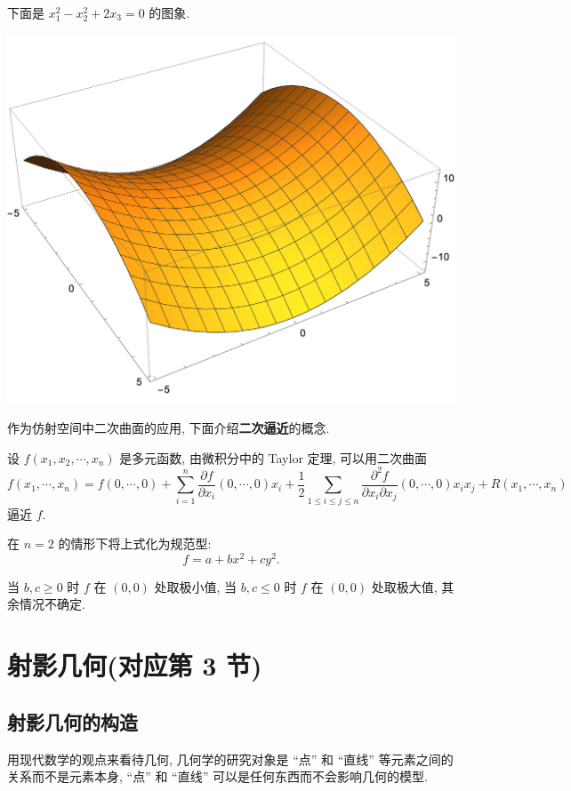 \documentclass[color=black,device=normal,lang=cn,mode=geye]{elegantnote}
\begin{document}
下面是 $x_1^2-x_2^2+2x_3=0$ 的图象.
\begin{center}
    \includegraphics[scale=.5]{materials/4.png}
\end{center}
作为仿射空间中二次曲面的应用, 下面介绍\textbf{二次逼近}的概念.
\begin{example}
    设 $f(x_1,x_2,\cdots,x_n)$ 是多元函数, 由微积分中的 Taylor 定理, 可以用二次曲面
    \[f(x_1,\cdots,x_n)=f(0,\cdots,0)+\sum\limits_{i=1}^n\dfrac{\partial f}{\partial x_i}(0,\cdots,0)x_i+\dfrac{1}{2}\sum\limits_{1\leq i\leq j\leq n}\dfrac{\partial^2f}{\partial x_i\partial x_j}(0,\cdots,0)x_ix_j+R(x_1,\cdots,x_n)\]
    逼近 $f$.

    在 $n=2$ 的情形下将上式化为规范型:
    \[f=a+bx^2+cy^2.\]

    当 $b,c\geq0$ 时 $f$ 在 $(0,0)$ 处取极小值, 当 $b,c\leq0$ 时 $f$ 在 $(0,0)$ 处取极大值, 其余情况不确定.
\end{example}
\section{射影几何(对应第 3 节)}
\subsection{射影几何的构造}
用现代数学的观点来看待几何, 几何学的研究对象是 ``点'' 和 ``直线'' 等元素之间的关系而不是元素本身, ``点'' 和 ``直线'' 可以是任何东西而不会影响几何的模型.
\end{document}

